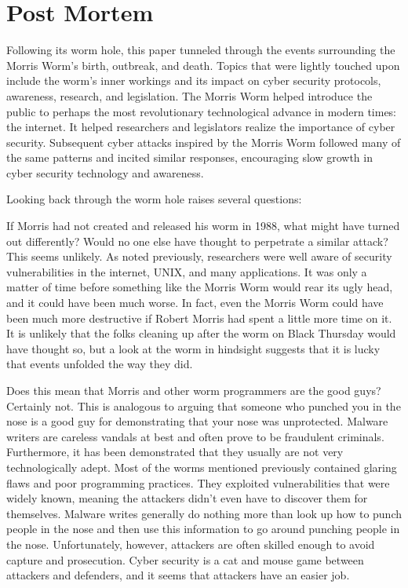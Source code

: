 \section*{Post Mortem}

Following its worm hole, this paper tunneled
through the events surrounding the Morris Worm's birth, outbreak, and death.
Topics that were lightly touched upon include the worm's inner workings and its
impact on cyber security protocols, awareness,
research, and legislation. The Morris Worm helped introduce the public to
perhaps the most revolutionary technological advance in modern times: the
internet. It helped researchers and legislators realize the importance of cyber
security. Subsequent cyber attacks inspired by the Morris Worm followed many of
the same patterns and incited similar responses, encouraging slow growth in
cyber security technology and awareness.

Looking back through the worm hole raises several questions: 

If Morris had not created and released his worm in 1988, what might have turned
out differently? Would no one else have thought to perpetrate a similar attack?
This seems unlikely. As noted previously, researchers were well aware of
security vulnerabilities in the internet, UNIX, and many applications. It was
only a matter of time before something like the Morris Worm would rear its ugly
head, and it could have been much worse. In fact, even the Morris
Worm could have been much more destructive if Robert Morris had spent a little
more time on it. It is unlikely that the folks cleaning up after the worm on
Black Thursday would have thought so, but a look at the worm in hindsight
suggests that it is lucky that events unfolded the way they did.

Does this mean that Morris and other worm programmers are the good guys?
Certainly not. This is analogous to arguing that someone who punched you in the
nose is a good guy for demonstrating that your nose was unprotected. Malware
writers are careless vandals at best and often prove to be fraudulent criminals.
Furthermore, it has been demonstrated that they usually are not very 
technologically adept. Most of the worms mentioned previously contained glaring
flaws and poor programming practices. They exploited vulnerabilities that were
widely known, meaning the attackers didn't even have to discover them
for themselves. Malware writes generally do nothing more than look up how to
punch people in the nose and then use this information to go around punching
people in the nose.
Unfortunately, however, attackers are often skilled enough to avoid capture and prosecution.
Cyber security is a cat and mouse game between attackers and defenders, and it
seems that attackers have an easier job.

